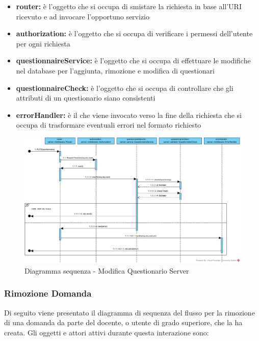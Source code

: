 \documentclass[12pt,a4paper]{article}
\begin{document}
\begin{itemize}
	\item \textbf{router:} è l'oggetto che si occupa di smistare la richiesta in base all’URI ricevuto e ad invocare l’opportuno servizio
	\item \textbf{authorization:} è l'oggetto che si occupa di verificare i permessi dell'utente per ogni richiesta	
	\item \textbf{questionnaireService:} è l'oggetto che si occupa di effettuare le modifiche nel database per l'aggiunta, rimozione e modifica di questionari
	\item \textbf{questionnaireCheck:} è l'oggetto che si occupa di controllare che gli attributi di un questionario siano consistenti
	\item \textbf{errorHandler:} è il  che viene invocato verso la fine della richiesta che si occupa di trasformare eventuali errori nel formato  richiesto
\end{itemize}

\begin{center}
	\begin{figure}[H]
		\centering \includegraphics[max width=\myheight, angle=90]{../img/diagrammiSequenza/modificaQuestionarioServer.png}
		\caption{Diagramma sequenza - Modifica Questionario Server}
	\end{figure}
\end{center}

\newpage
\subsubsection{Rimozione Domanda}
Di seguito viene presentato il diagramma di sequenza del flusso per la rimozione di una domanda da parte del docente, o utente di grado superiore, che la ha creata. Gli oggetti e attori attivi durante questa interazione sono:
\end{document}
